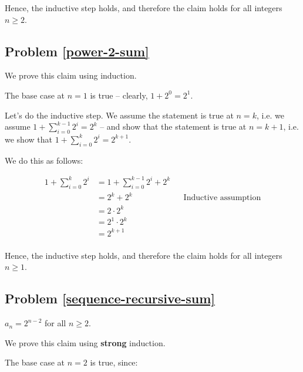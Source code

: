 Hence, the inductive step holds, and therefore the claim holds for all integers $n \geq 2$. 



\subsection{Problem \ref{power-2-sum}}

We prove this claim using induction. 

The base case at $n = 1$ is true -- clearly, $1 + 2^0 = 2^1$. 

Let's do the inductive step. We assume the statement is true at $n = k$, i.e. we assume $1 + \sum_{i=0}^{k-1} 2^i = 2^k$ -- and show that the statement is true at $n = k + 1$, i.e. we show that $1 + \sum_{i=0}^{k} 2^i = 2^{k+1}$.

We do this as follows: 


\begin{align*}
1 + \sum_{i=0}^{k} 2^i &= 1 + \sum_{i=0}^{k-1} 2^i + 2^k \\
&= 2^k + 2^k && \text{Inductive assumption} \\
&= 2 \cdot 2^k \\
&= 2^1 \cdot 2^k \\
&= 2^{k+1} \\
\end{align*}

Hence, the inductive step holds, and therefore the claim holds for all integers $n \geq 1$. 

\subsection{Problem \ref{sequence-recursive-sum}}

$a_n = 2^{n-2}$ for all $n \geq 2$. 


We prove this claim using \textbf{strong} induction. 

The base case at $n = 2$ is true, since:

